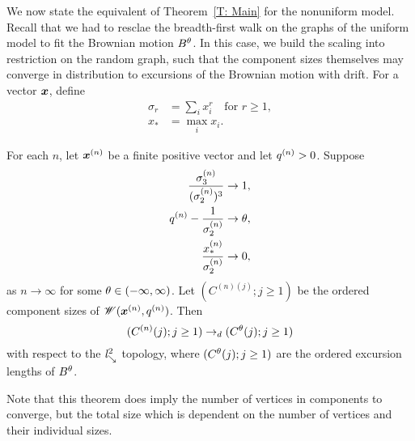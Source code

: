 We now state the equivalent of Theorem~\ref{T: Main} for the nonuniform model.
Recall that we had to resclae the breadth-first walk on the graphs of the uniform model to fit the Brownian motion $B^{\theta}$.
In this case, we build the scaling into restriction on the random graph, 
such that the component sizes themselves may converge in distribution to excursions of the Brownian motion with drift.
For a vector $\boldsymbol{x}$, define
\begin{equation}
\begin{aligned}
	\sigma_r &= \sum_{i} x_i^r \quad \text{for $r \geq 1$}, \\
	x_* &= \max_i x_i.
\end{aligned}
\end{equation}

\begin{theorem} \label{T: Main nonuniform}
	For each $n$, let $\boldsymbol{x}^{(n)}$ be a finite positive vector and let $q^{(n)} > 0$.
	Suppose
	\begin{align}
		\frac{\sigma^{(n)}_3}{(\sigma^{(n)}_2)^3} &\rightarrow 1, \label{E: main nonu cond 1} \\ 
		q^{(n)} - \frac{1}{\sigma^{(n)}_2} &\rightarrow \theta, \label{E: main nonu cond 2} \\ 
		\frac{x_*^{(n)}}{\sigma^{(n)}_2} &\rightarrow 0, \label{E: main nonu cond 3}
	\end{align}
	as $n \rightarrow \infty$ for some $\theta \in (-\infty, \infty)$.
	Let $(C^{(n)(j)}; j \geq 1)$ be the ordered component sizes of $\mathscr{W}(\boldsymbol{x}^{(n)}, q^{(n)})$.
	Then
	\begin{equation}
		(C^{(n)}(j); j \geq 1) \rightarrow_d (C^{\theta}(j); j \geq 1)
	\end{equation}
	with respect to the $\mathit{l}^2_{\searrow}$ topology, where $(C^{\theta}(j); j \geq 1)$ are the ordered excursion lengths of $B^{\theta}$.
\end{theorem}

Note that this theorem does imply the number of vertices in components to converge,
but the total size which is dependent on the number of vertices and their individual sizes.

